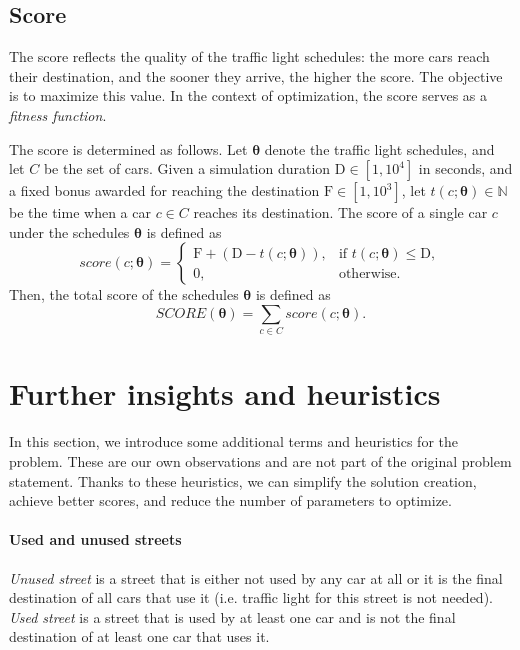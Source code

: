 \newpage

\subsection{Score}

The score reflects the quality of the traffic light schedules: the more cars reach their destination, and the sooner they arrive, the higher the score.
The objective is to maximize this value.
In the context of optimization, the score serves as a \textit{fitness function}.

The score is determined as follows. Let $\bm{\theta}$ denote the traffic light schedules, and let $C$ be the set of cars.
Given a simulation duration $\mathrm{D} \in [1, 10^4]$ in seconds,
and a fixed bonus awarded for reaching the destination $\mathrm{F} \in [1, 10^3]$,
let $t(c; \bm{\theta}) \in \mathbb{N}$ be the time when a car $c \in C$ reaches its destination.
The score of a single car $c$ under the schedules $\bm{\theta}$ is defined as
\begin{equation}
    score(c; \bm{\theta}) =
    \begin{cases}
        \mathrm{F} + (\mathrm{D} - t(c; \bm{\theta})), & \text{if $t(c; \bm{\theta}) \leq \mathrm{D}$}, \\
        0, & \text{otherwise}.
    \end{cases}
\end{equation}
Then, the total score of the schedules $\bm{\theta}$ is defined as
\begin{equation}
    SCORE(\bm{\theta}) = \sum_{c \in C} score(c; \bm{\theta}).
\end{equation}

\section{Further insights and heuristics} \label{sec:further_insights_and_heuristics}

In this section, we introduce some additional terms and heuristics for the problem. These are our own observations and are not part of the original problem statement. Thanks to these heuristics, we can simplify the solution creation, achieve better scores, and reduce the number of parameters to optimize.

\paragraph{Used and unused streets} \textit{Unused street} is a street that is either not used by any car at all or it is the final destination of all cars that use it (i.e. traffic light for this street is not needed). \textit{Used street} is a street that is used by at least one car and is not the final destination of at least one car that uses it.

